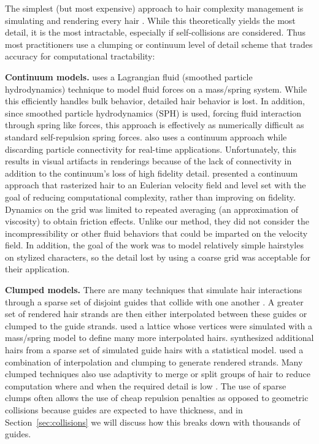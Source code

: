 The simplest (but most expensive) approach to hair complexity
management is simulating and rendering every hair
\cite{rosenblum:1991:hair,anjyo:1992:hair,selle:2008:hair}. While this
theoretically yields the most detail, it is the most intractable,
especially if self-collisions are considered.  Thus most practitioners
use a clumping or continuum level of detail scheme that trades
accuracy for computational tractability:

\textbf{Continuum models.}  \cite{hadap:2001:continuum-hair} uses a Lagrangian
fluid (smoothed particle hydrodynamics) technique to model fluid forces on a
mass/spring system. While this efficiently handles bulk behavior, detailed hair
behavior is lost. In addition, since smoothed particle hydrodynamics (SPH) is
used, forcing fluid interaction through spring like forces, this approach is
effectively as numerically difficult as standard self-repulsion spring forces.
\cite{bando:2003:hair-loosely-connected-particles} also uses a continuum
approach while discarding particle connectivity for real-time
applications. Unfortunately, this results in visual artifacts in renderings
because of the lack of connectivity in addition to the continuum's loss of high
fidelity detail.  \cite{petrovic:2005:levelset-hair} presented a continuum
approach that rasterized hair to an Eulerian velocity field and level set with
the goal of reducing computational complexity, rather than improving on
fidelity. Dynamics on the grid was limited to repeated averaging (an
approximation of viscosity) to obtain friction effects. Unlike our method,
they did not consider the incompressibility or other fluid behaviors that could
be imparted on the velocity field. In addition, the goal of the work was to
model relatively simple hairstyles on stylized characters, so the detail lost by
using a coarse grid was acceptable for their application.

\textbf{Clumped models.}  There are many techniques that simulate hair
interactions through a sparse set of disjoint guides that collide with one
another
\cite{bertails:2006:superhelices,hadap:2006:orientedstrands,gupta:2006:real-time-hair,chang:2002:mutualinteractions}.
A greater set of rendered hair strands are then either interpolated between
these guides or clumped to the guide strands.
\cite{plante:2002:hair-complexity} used a lattice whose vertices were simulated
with a mass/spring model to define many more interpolated
hairs. \cite{choe:2005:simulating-complex-hair} synthesized additional hairs
from a sparse set of simulated guide hairs with a statistical
model. \cite{bertails:2006:superhelices} used a combination of interpolation and
clumping to generate rendered strands.  Many clumped techniques also use
adaptivity to merge or split groups of hair to reduce computation where and when
the required detail is low
\cite{bertails:2003:adaptive-wisp-tree,ward:2003:modeling-hair-lod,ward:2003:adaptive-grouping-hair}. The
use of sparse clumps often allows the use of cheap repulsion penalties as
opposed to geometric collisions because guides are expected to have
thickness, and in Section~\ref{sec:collisions} we will discuss how this breaks
down with thousands of guides.

